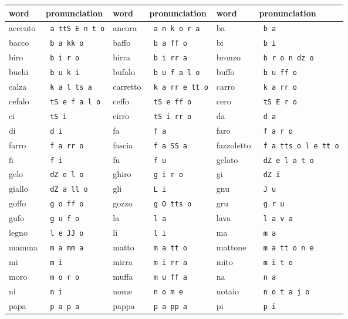 \begin{tabular}{ll|ll|ll}\hline\hline
word & pronunciation & word & pronunciation & word & pronunciation \\ \hline
accento & \texttt{ a ttS E n t o} & ancora & \texttt{ a n k o r a} & ba & \texttt{ b a} \\
bacco & \texttt{ b a kk o} & baffo & \texttt{ b a ff o} & bi & \texttt{ b i} \\
biro & \texttt{ b i r o} & birra & \texttt{ b i rr a} & bronzo & \texttt{ b r o n dz o} \\
buchi & \texttt{ b u k i} & bufalo & \texttt{ b u f a l o} & buffo & \texttt{ b u ff o} \\
calza & \texttt{ k a l ts a} & carretto & \texttt{ k a rr e tt o} & carro & \texttt{ k a rr o} \\
cefalo & \texttt{ tS e f a l o} & ceffo & \texttt{ tS e ff o} & cero & \texttt{ tS E r o} \\
ci & \texttt{ tS i} & cirro & \texttt{ tS i rr o} & da & \texttt{ d a} \\
di & \texttt{ d i} & fa & \texttt{ f a} & faro & \texttt{ f a r o} \\
farro & \texttt{ f a rr o} & fascia & \texttt{ f a SS a} & fazzoletto & \texttt{ f a tts o l e tt o} \\
fi & \texttt{ f i} & fu & \texttt{ f u} & gelato & \texttt{ dZ e l a t o} \\
gelo & \texttt{ dZ e l o} & ghiro & \texttt{ g i r o} & gi & \texttt{ dZ i} \\
giallo & \texttt{ dZ a ll o} & gli & \texttt{ L i} & gnu & \texttt{ J u} \\
goffo & \texttt{ g o ff o} & gozzo & \texttt{ g O tts o} & gru & \texttt{ g r u} \\
gufo & \texttt{ g u f o} & la & \texttt{ l a} & lava & \texttt{ l a v a} \\
legno & \texttt{ l e JJ o} & li & \texttt{ l i} & ma & \texttt{ m a} \\
mamma & \texttt{ m a mm a} & matto & \texttt{ m a tt o} & mattone & \texttt{ m a tt o n e} \\
mi & \texttt{ m i} & mirra & \texttt{ m i rr a} & mito & \texttt{ m i t o} \\
moro & \texttt{ m o r o} & muffa & \texttt{ m u ff a} & na & \texttt{ n a} \\
ni & \texttt{ n i} & nome & \texttt{ n o m e} & notaio & \texttt{ n o t a j o} \\
papa & \texttt{ p a p a} & pappa & \texttt{ p a pp a} & pi & \texttt{ p i} \\

\end{tabular}
